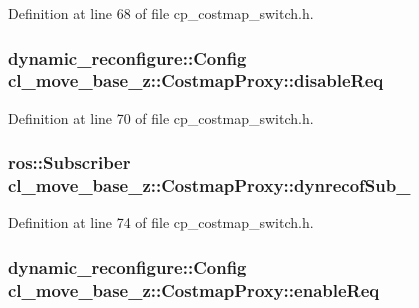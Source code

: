 Definition at line 68 of file cp\+\_\+costmap\+\_\+switch.\+h.

\subsubsection[{\texorpdfstring{disable\+Req}{disableReq}}]{\setlength{\rightskip}{0pt plus 5cm}dynamic\+\_\+reconfigure\+::\+Config cl\+\_\+move\+\_\+base\+\_\+z\+::\+Costmap\+Proxy\+::disable\+Req\hspace{0.3cm}{\ttfamily [private]}}\hypertarget{classcl__move__base__z_1_1CostmapProxy_a798847a9ee787134e26326edc574020f}{}\label{classcl__move__base__z_1_1CostmapProxy_a798847a9ee787134e26326edc574020f}


Definition at line 70 of file cp\+\_\+costmap\+\_\+switch.\+h.

\subsubsection[{\texorpdfstring{dynrecof\+Sub\+\_\+}{dynrecofSub_}}]{\setlength{\rightskip}{0pt plus 5cm}ros\+::\+Subscriber cl\+\_\+move\+\_\+base\+\_\+z\+::\+Costmap\+Proxy\+::dynrecof\+Sub\+\_\+\hspace{0.3cm}{\ttfamily [private]}}\hypertarget{classcl__move__base__z_1_1CostmapProxy_a7443ac3dd932a33b3dc9d8ccc9aa2a91}{}\label{classcl__move__base__z_1_1CostmapProxy_a7443ac3dd932a33b3dc9d8ccc9aa2a91}


Definition at line 74 of file cp\+\_\+costmap\+\_\+switch.\+h.

\subsubsection[{\texorpdfstring{enable\+Req}{enableReq}}]{\setlength{\rightskip}{0pt plus 5cm}dynamic\+\_\+reconfigure\+::\+Config cl\+\_\+move\+\_\+base\+\_\+z\+::\+Costmap\+Proxy\+::enable\+Req\hspace{0.3cm}{\ttfamily [private]}}\hypertarget{classcl__move__base__z_1_1CostmapProxy_aff2defa5d265d3e8efda4849eedd3500}{}\label{classcl__move__base__z_1_1CostmapProxy_aff2defa5d265d3e8efda4849eedd3500}


